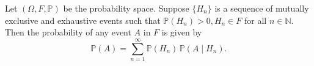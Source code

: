 \begin{theorem}
    Let $(\Omega, F, \mathbb{P})$ be the probability space. Suppose 
    $\{H_n\}$ is a sequence of mutually exclusive and exhaustive events 
    such that $\mathbb{P}(H_n) > 0, H_n \in F$ for all $n \in \mathbb{N}$. 
    Then the probability of any event $A$ in $F$ is given by 
    \begin{equation}
        \mathbb{P}(A) = \sum^\infty_{n=1} \mathbb{P}(H_n)\, \mathbb{P}(A \mid H_n).
    \end{equation}
\end{theorem}